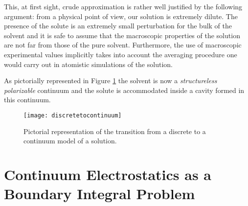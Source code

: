 This, at first sight, crude approximation is rather well justified by
the following argument: from a physical point of view, our solution is
extremely dilute. The presence of the solute is an extremely small
perturbation for the bulk of the solvent and it is safe to assume that
the macroscopic properties of the solution are not far from those of the
pure solvent. Furthermore, the use of macroscopic experimental values
implicitly takes into account the averaging procedure one would carry
out in atomistic simulations of the solution.

As pictorially represented in Figure \ref{fig:discretetocontinuum} the
solvent is now a \emph{structureless polarizable} continuum and the
solute is accommodated inside a cavity formed in this continuum.
\begin{figure}[!h]
 \centering
\texttt{[image: discretetocontinuum]}
\caption{Pictorial representation of the transition from a discrete to a
continuum model of a solution.}
\label{fig:discretetocontinuum}
\end{figure}


\section{Continuum Electrostatics as a Boundary Integral Problem}\label{sec:IEF}


